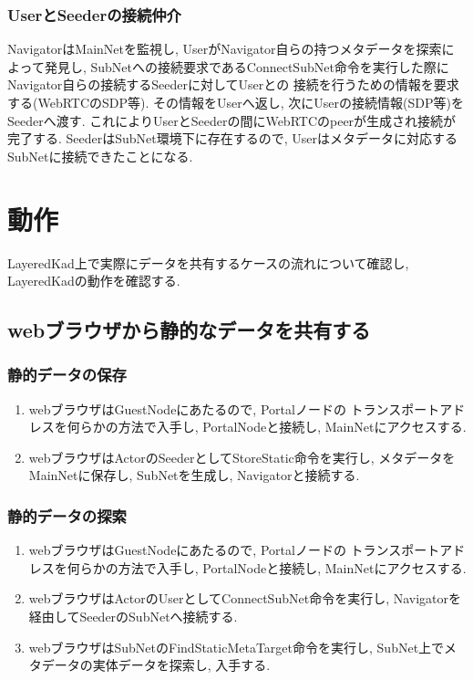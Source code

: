 \documentclass[sotsuron]{jcsie}
\begin{document}
\subsubsection{UserとSeederの接続仲介}
NavigatorはMainNetを監視し, 
UserがNavigator自らの持つメタデータを探索によって発見し, 
SubNetへの接続要求であるConnectSubNet命令を実行した際に
Navigator自らの接続するSeederに対してUserとの
接続を行うための情報を要求する(WebRTCのSDP等).
その情報をUserへ返し, 次にUserの接続情報(SDP等)をSeederへ渡す.
これによりUserとSeederの間にWebRTCのpeerが生成され接続が完了する.
SeederはSubNet環境下に存在するので, 
Userはメタデータに対応するSubNetに接続できたことになる.

\section{動作}
LayeredKad上で実際にデータを共有するケースの流れについて確認し, 
LayeredKadの動作を確認する.

\subsection{webブラウザから静的なデータを共有する}
\subsubsection{静的データの保存}
\begin{enumerate}
	\item 
	      webブラウザはGuestNodeにあたるので, Portalノードの
	      トランスポートアドレスを何らかの方法で入手し, PortalNodeと接続し, 
	      MainNetにアクセスする.
	      \\
	\item
	      webブラウザはActorのSeederとしてStoreStatic命令を実行し, 
	      メタデータをMainNetに保存し, SubNetを生成し, Navigatorと接続する.
\end{enumerate}
\subsubsection{静的データの探索}
\begin{enumerate}
	\item 
	      webブラウザはGuestNodeにあたるので, Portalノードの
	      トランスポートアドレスを何らかの方法で入手し, PortalNodeと接続し, 
	      MainNetにアクセスする.
	      \\
	\item
	      webブラウザはActorのUserとしてConnectSubNet命令を実行し, 
	      Navigatorを経由してSeederのSubNetへ接続する.
	      \\
	\item 
	      webブラウザはSubNetのFindStaticMetaTarget命令を実行し, 
	      SubNet上でメタデータの実体データを探索し, 入手する.
\end{enumerate}
\end{document}
